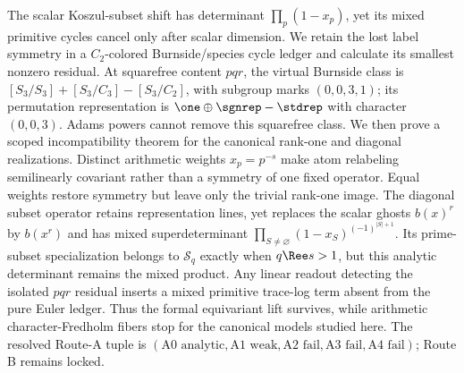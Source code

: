 The scalar Koszul-subset shift has determinant
$\prod_p(1-x_p)$, yet its mixed primitive cycles cancel only after scalar
dimension.  We retain the lost label symmetry in a $C_2$-colored
Burnside/species cycle ledger and calculate its smallest nonzero residual.
At squarefree content $pqr$, the virtual Burnside class is
$[S_3/S_3]+[S_3/C_3]-[S_3/C_2]$, with subgroup marks $(0,0,3,1)$; its
permutation representation is
$\one\oplus\sgnrep-\stdrep$ with character $(0,0,3)$.  Adams powers cannot
remove this squarefree class.  We then prove a scoped incompatibility theorem
for the canonical rank-one and diagonal realizations.  Distinct arithmetic
weights $x_p=p^{-s}$ make atom relabeling semilinearly covariant rather than
a symmetry of one fixed operator.  Equal weights restore symmetry but leave
only the trivial rank-one image.  The diagonal subset operator retains
representation lines, yet replaces the scalar ghosts $b(x)^r$ by
$b(x^r)$ and has mixed superdeterminant
$\prod_{S\ne\varnothing}(1-x_S)^{(-1)^{|S|+1}}$.  Its prime-subset
specialization belongs to $\mathcal S_q$ exactly when
$q\Ree s>1$, but this analytic determinant remains the mixed product.  Any
linear readout detecting the isolated $pqr$ residual inserts a mixed
primitive trace-log term absent from the pure Euler ledger.  Thus the formal
equivariant lift survives, while arithmetic character-Fredholm fibers stop
for the canonical models studied here.  The resolved Route-A tuple is
$(\text{A0 analytic},\text{A1 weak},\text{A2 fail},\text{A3 fail},
\text{A4 fail})$; Route B remains locked.
